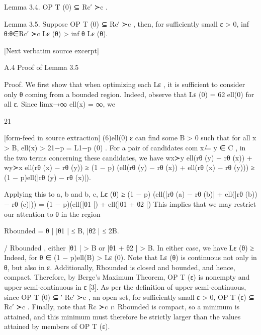 \documentclass[10pt]{article}
\begin{document}
\begin{ReviewVerbatim}
Lemma 3.4. OP T (0) ⊆ Rc′ ≻c .

Lemma 3.5. Suppose OP T (0) ⊆ Rc′ ≻c , then, for sufficiently small ε > 0, inf θ:θ∈Rc′ ≻c Lε (θ) >
inf θ Lε (θ).

[Next verbatim source excerpt]

A.4   Proof of Lemma 3.5

Proof. We first show that when optimizing each Lε , it is sufficient to consider only θ coming from
a bounded region. Indeed, observe that Lε (0) = 62 ell(0) for all ε. Since limx→∞ ell(x) = ∞, we


                                                      21

[form-feed in source extraction]
                                                         (6)ell(0)     ε
can find some B > 0 such that for all x > B, ell(x) > 21−p = L1−p        (0)
                                                                           . For a pair of candidates
           com
x ̸= y ∈ C     , in the two terms concerning these candidates, we have
                            wx≻y ell(rθ (y) − rθ (x)) + wy≻x ell(rθ (x) − rθ (y))
                          ≥ (1 − p) (ell(rθ (y) − rθ (x)) + ell(rθ (x) − rθ (y)))
                          ≥ (1 − p)ell(|rθ (y) − rθ (x)|).

Applying this to {a, b} and {b, c},
                      Lε (θ) ≥ (1 − p) (ell(|rθ (a) − rθ (b)| + ell(|rθ (b)) − rθ (c)|))
                             = (1 − p)(ell(|θ1 |) + ell(|θ1 + θ2 |)
This implies that we may restrict our attention to θ in the region

                                Rbounded = {θ | |θ1 | ≤ B, |θ2 | ≤ 2B}.

              / Rbounded , either |θ1 | > B or |θ1 + θ2 | > B. In either case, we have Lε (θ) ≥
Indeed, for θ ∈
(1 − p)ell(B) > Lε (0).
Note that Lε (θ) is continuous not only in θ, but also in ε. Additionally, Rbounded is closed and
bounded, and hence, compact. Therefore, by Berge’s Maximum Theorem, OP T (ε) is nonempty and
upper semi-continuous in ε [3]. As per the definition of upper semi-continuous, since OP T (0) ⊆
                                                                                             ′
Rc′ ≻c , an open set, for sufficiently small ε > 0, OP T (ε) ⊆ Rc′ ≻c . Finally, note that Rc ≻c ∩
Rbounded is compact, so a minimum is attained, and this minimum must therefore be strictly larger
than the values attained by members of OP T (ε).
\end{ReviewVerbatim}
\end{document}

